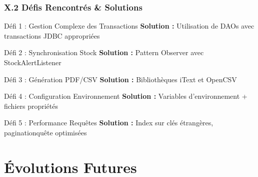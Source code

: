 \documentclass[11pt, aspectratio=169]{beamer}
\begin{document}
\begin{frame}
    \frametitle{X.2 Défis Rencontrés \& Solutions}
    
    \begin{block}{Défi 1 : Gestion Complexe des Transactions}
        \textbf{Solution :} Utilisation de DAOs avec transactions JDBC appropriées
    \end{block}
    
    \vspace{0.5cm}
    
    \begin{block}{Défi 2 : Synchronisation Stock}
        \textbf{Solution :} Pattern Observer avec StockAlertListener
    \end{block}
    
    \vspace{0.5cm}
    
    \begin{block}{Défi 3 : Génération PDF/CSV}
        \textbf{Solution :} Bibliothèques iText et OpenCSV
    \end{block}
    
    \vspace{0.5cm}
    
    \begin{block}{Défi 4 : Configuration Environnement}
        \textbf{Solution :} Variables d'environnement + fichiers propriétés
    \end{block}
    
    \vspace{0.5cm}
    
    \begin{block}{Défi 5 : Performance Requêtes}
        \textbf{Solution :} Index sur clés étrangères, paginationquête optimisées
    \end{block}
\end{frame}


\section{Évolutions Futures}
\end{document}
